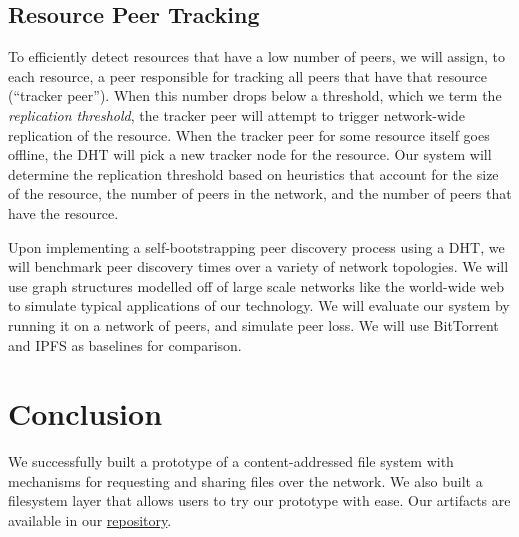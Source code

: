 \documentclass[twocolumn]{article}
\begin{document}
\subsection{Resource Peer Tracking}

To efficiently detect resources that have a low number of peers, we will assign, to each resource, a peer responsible for tracking all peers that have that resource (``tracker peer'').
When this number drops below a threshold, which we term the \textit{replication threshold}, the tracker peer will attempt to trigger network-wide replication of the resource.
When the tracker peer for some resource itself goes offline, the DHT will pick a new tracker node for the resource.
Our system will determine the replication threshold based on heuristics that account for the size of the resource, the number of peers in the network, and the number of peers that have the resource.

Upon implementing a self-bootstrapping peer discovery process using a DHT, we will benchmark peer discovery times over a variety of network topologies.
We will use graph structures modelled off of large scale networks like the world-wide web to simulate typical applications of our technology.
We will evaluate our system by running it on a network of peers, and simulate peer loss.
We will use BitTorrent and IPFS as baselines for comparison.

\section{Conclusion}

We successfully built a prototype of a content-addressed file system with mechanisms for requesting and sharing files over the network.
We also built a filesystem layer that allows users to try our prototype with ease.
Our artifacts are available in our \href{https://github.com/shreyasminocha/comp517-project/tree/master/project/dfs}{repository}.


\end{document}
